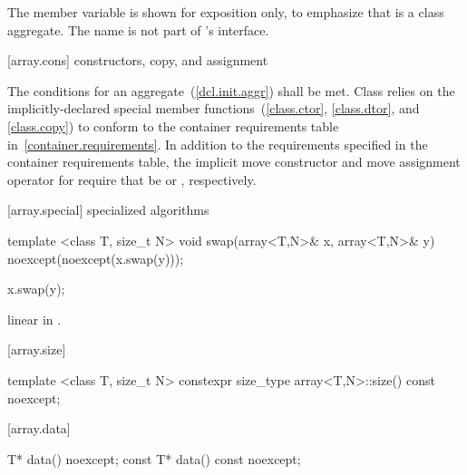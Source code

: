 \pnum
\enternote The member variable  is shown for exposition only,
to emphasize that  is a class aggregate.  The name 
is not part of 's interface. \exitnote

[array.cons]{ constructors, copy, and assignment}

\pnum
{}%
%
The conditions for an aggregate~(\ref{dcl.init.aggr}) shall be
met. Class  relies on the implicitly-declared special
member functions~(\ref{class.ctor}, \ref{class.dtor}, and \ref{class.copy}) to
conform to the container requirements table in~\ref{container.requirements}.
In addition to the requirements specified in the container requirements table,
the implicit move constructor and move assignment operator for 
require that  be  or ,
respectively.

[array.special]{ specialized algorithms}

%
%
\begin{itemdecl}
template <class T, size_t N> void swap(array<T,N>& x, array<T,N>& y) noexcept(noexcept(x.swap(y)));
\end{itemdecl}

\begin{itemdescr}
\pnum\effects
\begin{codeblock}
x.swap(y);
\end{codeblock}

\pnum
\complexity linear in .
\end{itemdescr}

[array.size]{}

%
%
\begin{itemdecl}
template <class T, size_t N> constexpr size_type array<T,N>::size() const noexcept;
\end{itemdecl}

\begin{itemdescr}
\pnum\returns {}
\end{itemdescr}

[array.data]{}
%
%
\begin{itemdecl}
T* data() noexcept;
const T* data() const noexcept;
\end{itemdecl}

